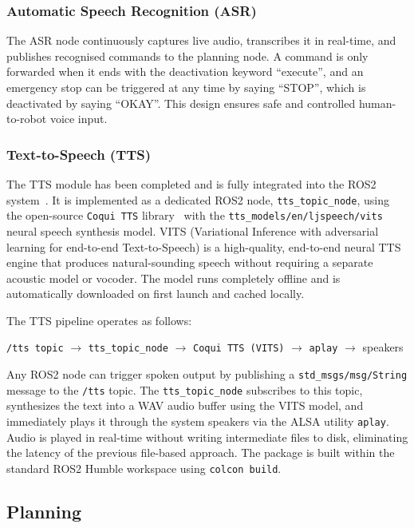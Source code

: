 \documentclass[12pt]{extarticle}
\begin{document}
\subsubsection{Automatic Speech Recognition (ASR)}
The ASR node continuously captures live audio, transcribes it in real-time, and publishes recognised commands to the planning node. A command is only forwarded when it ends with the deactivation keyword ``execute'', and an emergency stop can be triggered at any time by saying ``STOP'', which is deactivated by saying ``OKAY''. This design ensures safe and controlled human-to-robot voice input.

\subsubsection{Text-to-Speech (TTS)}
The TTS module has been completed and is fully integrated into the ROS2 system~\cite{tts-ros2}. It is implemented as a dedicated ROS2 node, \texttt{tts\_topic\_node}, using the open-source \texttt{Coqui TTS} library~\cite{coqui-tts} with the \texttt{tts\_models/en/ljspeech/vits} neural speech synthesis model. VITS (Variational Inference with adversarial learning for end-to-end Text-to-Speech) is a high-quality, end-to-end neural TTS engine that produces natural-sounding speech without requiring a separate acoustic model or vocoder. The model runs completely offline and is automatically downloaded on first launch and cached locally.

The TTS pipeline operates as follows:

\begin{center}
\texttt{/tts topic} $\rightarrow$ \texttt{tts\_topic\_node} $\rightarrow$ \texttt{Coqui TTS (VITS)} $\rightarrow$ \texttt{aplay} $\rightarrow$ speakers
\end{center}

Any ROS2 node can trigger spoken output by publishing a \texttt{std\_msgs/msg/String} message to the \texttt{/tts} topic. The \texttt{tts\_topic\_node} subscribes to this topic, synthesizes the text into a WAV audio buffer using the VITS model, and immediately plays it through the system speakers via the ALSA utility \texttt{aplay}. Audio is played in real-time without writing intermediate files to disk, eliminating the latency of the previous file-based approach. The package is built within the standard ROS2 Humble workspace using \texttt{colcon build}.

\subsection{Planning}
\end{document}
